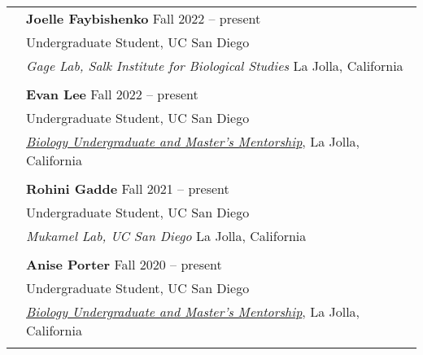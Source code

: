 \documentclass[letterpaper, 11pt]{article}
\begin{document}
\begin{longtable}{p{1.6in}p{4.9in}}
  
  

{\color{OliveGreen}{Mentorship}}
& \textbf{Joelle Faybishenko} \hfill Fall 2022 -- present \\
& Undergraduate Student, UC San Diego \\
& \textit{Gage Lab, Salk Institute for Biological Studies} \hfill La Jolla, California \\
& \\

& \textbf{Evan Lee} \hfill Fall 2022 -- present \\
& Undergraduate Student, UC San Diego \\
& \href{https://www.bummpucsd.org/about}{\textit{Biology Undergraduate and Master's Mentorship}}, \hfill La Jolla, California \\
& \\

& \textbf{Rohini Gadde} \hfill Fall 2021 -- present \\
& Undergraduate Student, UC San Diego \\
& \textit{Mukamel Lab, UC San Diego} \hfill La Jolla, California \\
& \\

& \textbf{Anise Porter} \hfill Fall 2020 -- present \\
& Undergraduate Student, UC San Diego \\
& \href{https://www.bummpucsd.org/about}{\textit{Biology Undergraduate and Master's Mentorship}}, \hfill La Jolla, California \\
& \\


\end{longtable}
\end{document}
